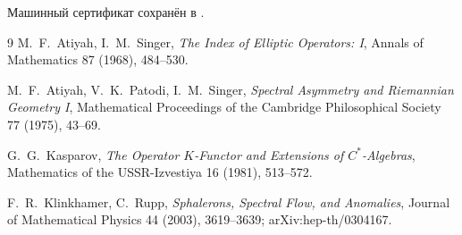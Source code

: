Машинный сертификат сохранён в
.

\begin{thebibliography}{9}
M.~F.~Atiyah, I.~M.~Singer,
\emph{The Index of Elliptic Operators: I},
Annals of Mathematics 87 (1968), 484--530.

M.~F.~Atiyah, V.~K.~Patodi, I.~M.~Singer,
\emph{Spectral Asymmetry and Riemannian Geometry I},
Mathematical Proceedings of the Cambridge Philosophical Society 77
(1975), 43--69.

G.~G.~Kasparov,
\emph{The Operator $K$-Functor and Extensions of $C^*$-Algebras},
Mathematics of the USSR-Izvestiya 16 (1981), 513--572.

F.~R.~Klinkhamer, C.~Rupp,
\emph{Sphalerons, Spectral Flow, and Anomalies},
Journal of Mathematical Physics 44 (2003), 3619--3639;
arXiv:hep-th/0304167.
\end{thebibliography}